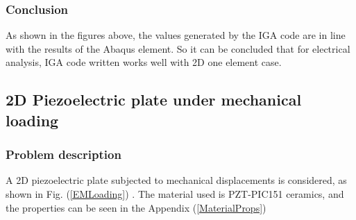 \documentclass[11pt]{article}
\begin{document}
\subsubsection{Conclusion}
As shown in the figures above, the values generated by the IGA code are in line with the results of the Abaqus element. So it can be concluded that for electrical analysis, IGA code written works well with 2D one element case.



\subsection{2D Piezoelectric plate under mechanical loading}
\subsubsection{Problem description} \label{2DPPWMLPD}
A 2D piezoelectric plate subjected to mechanical displacements is considered, as shown in Fig. (\ref{EMLoading}) . The material used is PZT-PIC151 ceramics, and the properties can be seen in the Appendix (\ref{MaterialProps})
\end{document}
